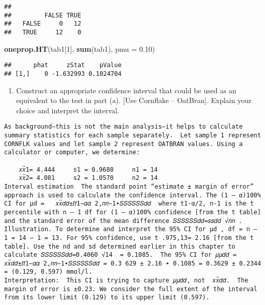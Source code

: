 \documentclass[
]{article}
\newenvironment{Shaded}{\begin{snugshade}}{\end{snugshade}}
\newcommand{\DataTypeTok}[1]{\textcolor[rgb]{0.13,0.29,0.53}{#1}}
\newcommand{\DecValTok}[1]{\textcolor[rgb]{0.00,0.00,0.81}{#1}}
\newcommand{\FloatTok}[1]{\textcolor[rgb]{0.00,0.00,0.81}{#1}}
\newcommand{\KeywordTok}[1]{\textcolor[rgb]{0.13,0.29,0.53}{\textbf{#1}}}
\newcommand{\NormalTok}[1]{#1}
\providecommand{\tightlist}{%
  \setlength{\itemsep}{0pt}\setlength{\parskip}{0pt}}
\begin{document}
\begin{verbatim}
##        
##         FALSE TRUE
##   FALSE     0   12
##   TRUE     12    0
\end{verbatim}

\begin{Shaded}
\begin{Highlighting}[]
\KeywordTok{oneprop.HT}\NormalTok{(tab1[}\DecValTok{1}\NormalTok{], }\KeywordTok{sum}\NormalTok{(tab1), }\DataTypeTok{pmu =} \FloatTok{0.10}\NormalTok{)}
\end{Highlighting}
\end{Shaded}

\begin{verbatim}
##      phat     zStat    pValue
## [1,]    0 -1.632993 0.1024704
\end{verbatim}

\begin{enumerate}
\def\labelenumi{\alph{enumi}.}
\setcounter{enumi}{1}
\tightlist
\item
  Construct an appropriate confidence interval that could be used as an
  equivalent to the test in part (a). {[}Use Cornflake -- OatBran{]}.
  Explain your choice and interpret the interval.
\end{enumerate}

\begin{verbatim}
As background—this is not the main analysis—it helps to calculate summary statistics for each sample separately.  Let sample 1 represent CORNFLK values and let sample 2 represent OATBRAN values. Using a calculator or computer, we determine: 
 
    𝑥𝑥̅1= 4.444     s1 = 0.9688     n1 = 14 
    𝑥𝑥̅2= 4.081     s2 = 1.0570     n2 = 14 
Interval estimation  The standard point “estimate ± margin of error” approach is used to calculate the confidence interval. The (1 – α)100% CI for µd =   𝑥𝑥̅𝑑𝑑±𝑡𝑡1−𝛼𝛼 2,𝑛𝑛−1∙𝑆𝑆𝑆𝑆𝑆𝑆𝑑𝑑  where t1-α/2, n-1 is the t percentile with n – 1 df for (1 – α)100% confidence [from the t table] and the standard error of the mean difference 𝑆𝑆𝑆𝑆𝑆𝑆𝑑𝑑=𝑠𝑠𝑑𝑑 √𝑛𝑛 .  Illustration. To determine and interpret the 95% CI for µd , df = n – 1 = 14 – 1 = 13. For 95% confidence, use t .975,13= 2.16 [from the t table]. Use the nd and sd determined earlier in this chapter to calculate 𝑆𝑆𝑆𝑆𝑆𝑆𝑑𝑑=0.4060 √14  = 0.1085.  The 95% CI for 𝜇𝜇𝑑𝑑 = 𝑥𝑥̅𝑑𝑑±𝑡𝑡1−𝛼𝛼 2,𝑛𝑛−1∙𝑆𝑆𝑆𝑆𝑆𝑆𝑑𝑑 = 0.3 629 ± 2.16 ∙ 0.1085 = 0.3629 ± 0.2344 = (0.129, 0.597) mmol/l.
Interpretation:  This CI is trying to capture 𝜇𝜇𝑑𝑑, not  𝑥𝑥̅𝑑𝑑.  The margin of error is ±0.23. We consider the full extent of the interval from its lower limit (0.129) to its upper limit (0.597).  
\end{verbatim}
\end{document}

